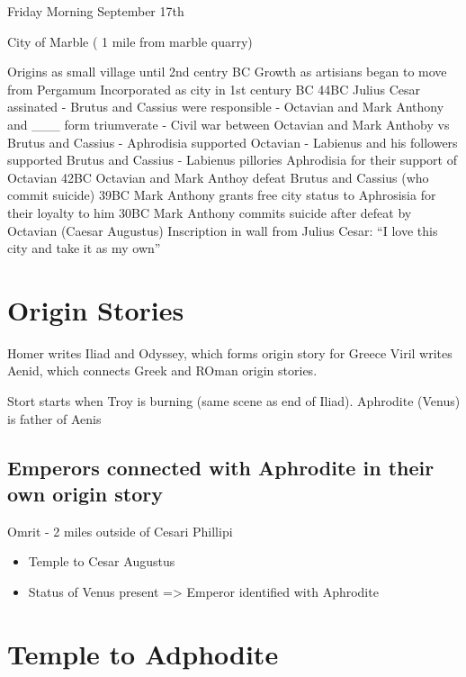 \documentclass[
]{book}
\providecommand{\tightlist}{%
  \setlength{\itemsep}{0pt}\setlength{\parskip}{0pt}}
\begin{document}
Friday Morning September 17th

City of Marble ( 1 mile from marble quarry)

Origins as small village until 2nd centry BC
Growth as artisians began to move from Pergamum
Incorporated as city in 1st century BC
44BC Julius Cesar assinated
- Brutus and Cassius were responsible
- Octavian and Mark Anthony and \_\_\_ form triumverate
- Civil war between Octavian and Mark Anthoby vs Brutus and Cassius
- Aphrodisia supported Octavian
- Labienus and his followers supported Brutus and Cassius
- Labienus pillories Aphrodisia for their support of Octavian
42BC Octavian and Mark Anthoy defeat Brutus and Cassius (who commit suicide)
39BC Mark Anthony grants free city status to Aphrosisia for their loyalty to him
30BC Mark Anthony commits suicide after defeat by Octavian (Caesar Augustus)
Inscription in wall from Julius Cesar: ``I love this city and take it as my own''

\hypertarget{origin-stories}{%
\section{Origin Stories}\label{origin-stories}}

Homer writes Iliad and Odyssey, which forms origin story for Greece
Viril writes Aenid, which connects Greek and ROman origin stories.

Stort starts when Troy is burning (same scene as end of Iliad).
Aphrodite (Venus) is father of Aenis

\hypertarget{emperors-connected-with-aphrodite-in-their-own-origin-story}{%
\subsection{Emperors connected with Aphrodite in their own origin story}\label{emperors-connected-with-aphrodite-in-their-own-origin-story}}

Omrit - 2 miles outside of Cesari Phillipi

\begin{itemize}
\tightlist
\item
  Temple to Cesar Augustus
\item
  Status of Venus present
  =\textgreater{} Emperor identified with Aphrodite
\end{itemize}

\hypertarget{temple-to-adphodite}{%
\section{Temple to Adphodite}\label{temple-to-adphodite}}
\end{document}
